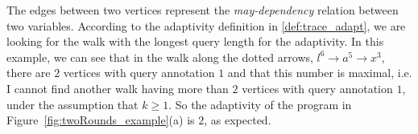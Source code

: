 \begin{example}[twoRounds]
      The edges between two vertices represent the \emph{may-dependency} relation between two variables.
      According to the adaptivity definition in \ref{def:trace_adapt},
      we are looking for the walk with the longest query length for the adaptivity.
      In this example, we can see that
      in the walk along the dotted arrows,  $l^{6} \to a^5 \to x^3 $, there are $2$ vertices with query annotation $1$ and that this number is maximal, i.e. I cannot find another walk having more than $2$ vertices with query annotation $1$, under the assumption that $k \geq 1$. So the adaptivity of the program in Figure~\ref{fig:twoRounds_example}(a)  is $2$,
      as expected.


\end{example}
